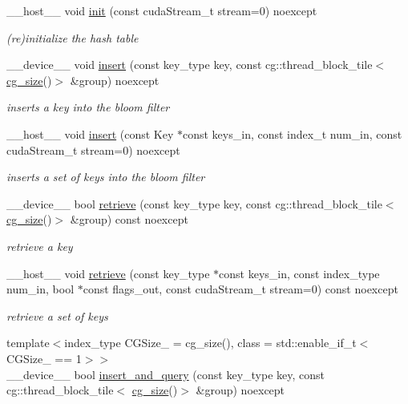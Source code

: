 \begin{DoxyCompactItemize}
\+\_\+\+\_\+host\+\_\+\+\_\+ void \hyperlink{classwarpcore_1_1BloomFilter_a33d24a1ae65b9a798107bd936989bf40}{init} (const cuda\+Stream\+\_\+t stream=0) noexcept
\begin{DoxyCompactList}\small\item\em (re)initialize the hash table \end{DoxyCompactList}\item 
\+\_\+\+\_\+device\+\_\+\+\_\+ void \hyperlink{classwarpcore_1_1BloomFilter_a4b3151a938a8248df22adbdefd63b8e0}{insert} (const key\+\_\+type key, const cg\+::thread\+\_\+block\+\_\+tile$<$ \hyperlink{classwarpcore_1_1BloomFilter_a6ad2335811852ad62fc65e85416d3904}{cg\+\_\+size}()$>$ \&group) noexcept
\begin{DoxyCompactList}\small\item\em inserts a key into the bloom filter \end{DoxyCompactList}\item 
\+\_\+\+\_\+host\+\_\+\+\_\+ void \hyperlink{classwarpcore_1_1BloomFilter_af00ab507c80a4cc717d5e08238f5a586}{insert} (const Key $\ast$const keys\+\_\+in, const index\+\_\+t num\+\_\+in, const cuda\+Stream\+\_\+t stream=0) noexcept
\begin{DoxyCompactList}\small\item\em inserts a set of keys into the bloom filter \end{DoxyCompactList}\item 
\+\_\+\+\_\+device\+\_\+\+\_\+ bool \hyperlink{classwarpcore_1_1BloomFilter_ad2621ee746d6a2ba6a0bed2ca3946aaa}{retrieve} (const key\+\_\+type key, const cg\+::thread\+\_\+block\+\_\+tile$<$ \hyperlink{classwarpcore_1_1BloomFilter_a6ad2335811852ad62fc65e85416d3904}{cg\+\_\+size}()$>$ \&group) const noexcept
\begin{DoxyCompactList}\small\item\em retrieve a key \end{DoxyCompactList}\item 
\+\_\+\+\_\+host\+\_\+\+\_\+ void \hyperlink{classwarpcore_1_1BloomFilter_ae5d69ae905baf6e218e508e8d8225afb}{retrieve} (const key\+\_\+type $\ast$const keys\+\_\+in, const index\+\_\+type num\+\_\+in, bool $\ast$const flags\+\_\+out, const cuda\+Stream\+\_\+t stream=0) const noexcept
\begin{DoxyCompactList}\small\item\em retrieve a set of keys \end{DoxyCompactList}\item 
{\footnotesize template$<$index\+\_\+type C\+G\+Size\+\_\+ = cg\+\_\+size(), class  = std\+::enable\+\_\+if\+\_\+t$<$\+C\+G\+Size\+\_\+ == 1$>$$>$ }\\\+\_\+\+\_\+device\+\_\+\+\_\+ bool \hyperlink{classwarpcore_1_1BloomFilter_afee625443b9351a88bc182386ca970a3}{insert\+\_\+and\+\_\+query} (const key\+\_\+type key, const cg\+::thread\+\_\+block\+\_\+tile$<$ \hyperlink{classwarpcore_1_1BloomFilter_a6ad2335811852ad62fc65e85416d3904}{cg\+\_\+size}()$>$ \&group) noexcept

\end{DoxyCompactItemize}
